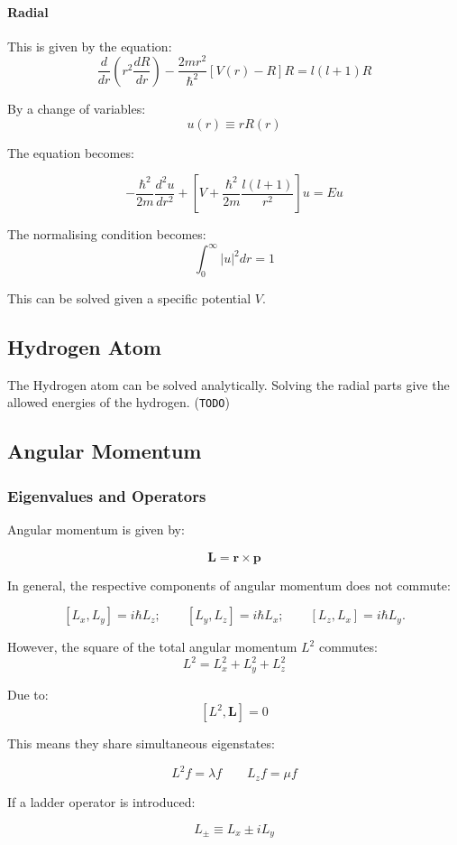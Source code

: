 \documentclass[12pt]{article}
\begin{document}
\paragraph{Radial}

This is given by the equation:
\[\frac{d}{dr}(r^2\frac{dR}{dr}) - \frac{2mr^2}{\hbar^2}[V(r)-R]R = l(l+1)R\]

By a change of variables: 
\[u(r) \equiv rR(r)\]

The equation becomes:

\[-\frac{\hbar^2}{2m}\frac{d^2u}{dr^2} + \left[V + \frac{\hbar^2}{2m}\frac{l(l+1)}{r^2}\right]u=Eu\]

The normalising condition becomes: 
\[\int_0^\infty|u|^2dr = 1\]

This can be solved given a specific potential $V$.

\subsection{Hydrogen Atom}

The Hydrogen atom can be solved analytically. Solving the radial parts give the allowed energies of the hydrogen. (\texttt{TODO})

\subsection{Angular Momentum}
\subsubsection{Eigenvalues and Operators}

Angular momentum is given by:

\[\mathbf{L} = \mathbf{r} \times \mathbf{p}\]

In general, the respective components of angular momentum does not commute:

\[[L_x, L_y] = i\hbar L_z; \qquad [L_y, L_z] = i\hbar L_x; \qquad [L_z,L_x] = i\hbar L_y.\]

However, the square of the total angular momentum $L^2$ commutes:
\[L^2 = L_x^2 + L_y^2 + L_z^2\]

Due to:
\[[L^2, \mathbf{L}] = 0\]

This means they share simultaneous eigenstates:

\[L^2f = \lambda f \qquad L_zf = \mu f\]

If a ladder operator is introduced:

\[L_\pm \equiv L_x \pm iL_y\]
\end{document}
